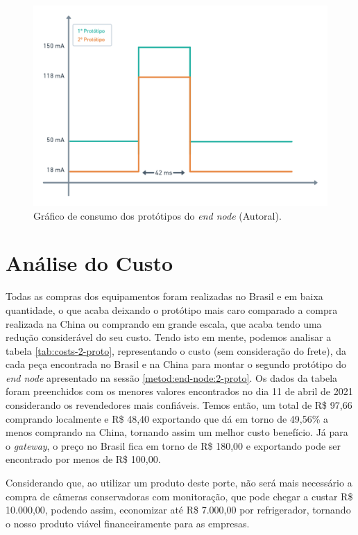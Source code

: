 \begin{figure}[H]
  \centering
  \includegraphics[width=.80\textwidth]{assets/end-node-consumption-chart.png} 
  \caption{Gráfico de consumo dos protótipos do \textit{end node} (Autoral).}
  \label{fig:end-node-consumption-chart} 
\end{figure}

\section{Análise do Custo}
\label{result:custo}
Todas as compras dos equipamentos foram realizadas no Brasil e em baixa quantidade, o que acaba deixando o protótipo mais caro comparado a compra realizada na China ou comprando em grande escala, que acaba tendo uma redução considerável do seu custo. Tendo isto em mente, podemos analisar a tabela \ref{tab:costs-2-proto}, representando o custo (sem consideração do frete), da cada peça encontrada no Brasil e na China para montar o segundo protótipo do \textit{end node} apresentado na sessão \ref{metod:end-node:2-proto}. Os dados da tabela foram preenchidos com os menores valores encontrados no dia 11 de abril de 2021 considerando os revendedores mais confiáveis. Temos então, um total de R\$ 97,66 comprando localmente e R\$ 48,40 exportando que dá em torno de 49,56\% a menos comprando na China, tornando assim um melhor custo benefício.	Já para o \textit{gateway}, o preço no Brasil fica em torno de R\$  180,00 e exportando pode ser encontrado por menos de R\$  100,00.

Considerando que, ao utilizar um produto deste porte, não será mais necessário a compra de câmeras conservadoras com monitoração,  que pode chegar a custar R\$ 10.000,00, podendo assim, economizar até R\$ 7.000,00 por refrigerador, tornando o nosso produto viável financeiramente para as empresas.

